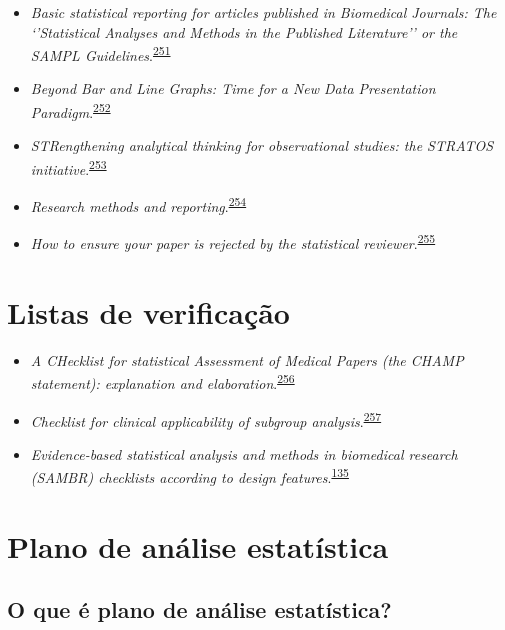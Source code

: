 \documentclass[
  a4paper,
]{book}
\begin{document}
\begin{itemize}
\item
  \emph{Basic statistical reporting for articles published in Biomedical Journals: The `'Statistical Analyses and Methods in the Published Literature'' or the SAMPL Guidelines}.\textsuperscript{\protect\hyperlink{ref-Lang2015}{251}}
\item
  \emph{Beyond Bar and Line Graphs: Time for a New Data Presentation Paradigm}.\textsuperscript{\protect\hyperlink{ref-Weissgerber2015}{252}}
\item
  \emph{STRengthening analytical thinking for observational studies: the STRATOS initiative}.\textsuperscript{\protect\hyperlink{ref-Sauerbrei2014}{253}}
\item
  \emph{Research methods and reporting}.\textsuperscript{\protect\hyperlink{ref-groves2008}{254}}
\item
  \emph{How to ensure your paper is rejected by the statistical reviewer}.\textsuperscript{\protect\hyperlink{ref-stratton2005}{255}}
\end{itemize}

\hypertarget{checklists}{%
\section{Listas de verificação}\label{checklists}}

\begin{itemize}
\item
  \emph{A CHecklist for statistical Assessment of Medical Papers (the CHAMP statement): explanation and elaboration}.\textsuperscript{\protect\hyperlink{ref-Mansournia2021}{256}}
\item
  \emph{Checklist for clinical applicability of subgroup analysis}.\textsuperscript{\protect\hyperlink{ref-Gil-Sierra2020}{257}}
\item
  \emph{Evidence-based statistical analysis and methods in biomedical research (SAMBR) checklists according to design features}.\textsuperscript{\protect\hyperlink{ref-dwivedi2019}{135}}
\end{itemize}

\hypertarget{plano-analise-estatistica}{%
\section{Plano de análise estatística}\label{plano-analise-estatistica}}

\hypertarget{o-que-uxe9-plano-de-anuxe1lise-estatuxedstica}{%
\subsection{O que é plano de análise estatística?}\label{o-que-uxe9-plano-de-anuxe1lise-estatuxedstica}}
\end{document}

